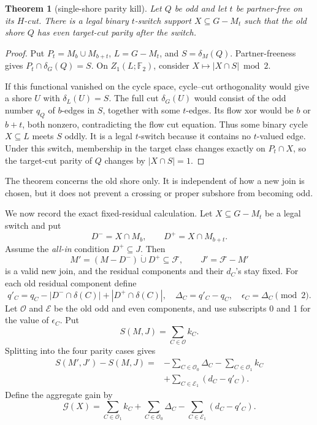 \documentclass[11pt]{article}
\newtheorem{theorem}{Theorem}[section]
\theoremstyle{definition}
\theoremstyle{remark}
\newcommand{\F}{\mathbb F}
\numberwithin{equation}{section}
\begin{document}
\begin{theorem}[single-shore parity kill]\label{thm:single-shore-kill}
Let \(Q\) be odd and let \(t\) be partner-free on its \(H\)-cut.  There is
a legal binary \(t\)-switch support \(X\subseteq G-M_t\) such that the old
shore \(Q\) has even target-cut parity after the switch.
\end{theorem}

\begin{proof}
Put \(P_t=M_b\cup M_{b+t}\), \(L=G-M_t\), and
\(S=\delta_M(Q)\).  Partner-freeness gives
\(P_t\cap\delta_G(Q)=S\).  On \(Z_1(L;\F_2)\), consider
\(X\mapsto|X\cap S|\bmod2\).

If this functional vanished on the cycle space, cycle--cut orthogonality
would give a shore \(U\) with \(\delta_L(U)=S\).  The full cut
\(\delta_G(U)\) would consist of the odd number \(q_Q\) of \(b\)-edges in
\(S\), together with some \(t\)-edges.  Its flow xor would be \(b\) or
\(b+t\), both nonzero, contradicting the flow cut equation.  Thus some
binary cycle \(X\subseteq L\) meets \(S\) oddly.  It is a legal
\(t\)-switch because it contains no \(t\)-valued edge.  Under this switch,
membership in the target class changes exactly on \(P_t\cap X\), so the
target-cut parity of \(Q\) changes by \(|X\cap S|=1\).
\end{proof}

The theorem concerns the old shore only.  It is independent of how a new
join is chosen, but it does not prevent a crossing or proper subshore from
becoming odd.

We now record the exact fixed-residual calculation.  Let
\(X\subseteq G-M_t\) be a legal switch and put
\[
 D^-=X\cap M_b,\qquad D^+=X\cap M_{b+t}.
\]
Assume the \emph{all-in} condition \(D^+\subseteq J\).  Then
\[
 M'=(M-D^-)\mathbin{\dot\cup}D^+\subseteq\mathcal F,
 \qquad J'=\mathcal F-M'
\]
is a valid new join, and the residual components and their \(d_C\)'s stay
fixed.  For each old residual component define
\[
 q'_C=q_C-|D^-\cap\delta(C)|+|D^+\cap\delta(C)|,\quad
 \Delta_C=q'_C-q_C,\quad \epsilon_C=\Delta_C\pmod2.
\]
Let \(\mathcal O\) and \(\mathcal E\) be the old odd and even components,
and use subscripts 0 and 1 for the value of \(\epsilon_C\).  Put
\[
 S(M,J)=\sum_{C\in\mathcal O}k_C.
\]
Splitting into the four parity cases gives
\begin{equation}
\begin{split}
 S(M',J')-S(M,J)
={}&-\sum_{C\in\mathcal O_0}\Delta_C
    -\sum_{C\in\mathcal O_1}k_C\\
 &+\sum_{C\in\mathcal E_1}(d_C-q'_C).                       \label{eq:aggregate-change}
\end{split}
\end{equation}
Define the aggregate gain by
\begin{equation}
 \mathcal G(X)=
 \sum_{C\in\mathcal O_1}k_C
 +\sum_{C\in\mathcal O_0}\Delta_C
 -\sum_{C\in\mathcal E_1}(d_C-q'_C).                       \label{eq:aggregate-gain}
\end{equation}
\end{document}
